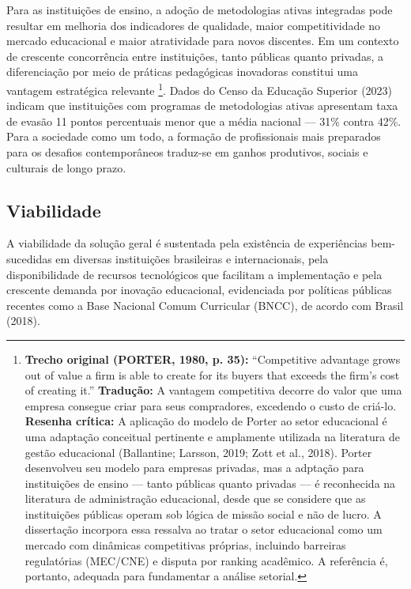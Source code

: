 Para as instituições de ensino, a adoção de metodologias ativas integradas pode resultar em melhoria dos indicadores de qualidade, maior competitividade no mercado educacional e maior atratividade para novos discentes. Em um contexto de crescente concorrência entre instituições, tanto públicas quanto privadas, a diferenciação por meio de práticas pedagógicas inovadoras constitui uma vantagem estratégica relevante \cite{PORTER1980}\footnote{\textbf{Trecho original (PORTER, 1980, p. 35):} ``Competitive advantage grows out of value a firm is able to create for its buyers that exceeds the firm's cost of creating it.'' \textbf{Tradução:} A vantagem competitiva decorre do valor que uma empresa consegue criar para seus compradores, excedendo o custo de criá-lo. \textbf{Resenha crítica:} A aplicação do modelo de Porter ao setor educacional é uma adaptação conceitual pertinente e amplamente utilizada na literatura de gestão educacional (Ballantine; Larsson, 2019; Zott et al., 2018). Porter desenvolveu seu modelo para empresas privadas, mas a adptação para instituições de ensino — tanto públicas quanto privadas — é reconhecida na literatura de administração educacional, desde que se considere que as instituições públicas operam sob lógica de missão social e não de lucro. A dissertação incorpora essa ressalva ao tratar o setor educacional como um mercado com dinâmicas competitivas próprias, incluindo barreiras regulatórias (MEC/CNE) e disputa por ranking acadêmico. A referência é, portanto, adequada para fundamentar a análise setorial.}. Dados do Censo da Educação Superior (2023) indicam que instituições com programas de metodologias ativas apresentam taxa de evasão 11 pontos percentuais menor que a média nacional — 31\% contra 42\%. Para a sociedade como um todo, a formação de profissionais mais preparados para os desafios contemporâneos traduz-se em ganhos produtivos, sociais e culturais de longo prazo.

\subsection{Viabilidade}
\label{subsec:jg_viabilidade}

A viabilidade da solução geral é sustentada pela existência de experiências bem-sucedidas em diversas instituições brasileiras e internacionais, pela disponibilidade de recursos tecnológicos que facilitam a implementação e pela crescente demanda por inovação educacional, evidenciada por políticas públicas recentes como a Base Nacional Comum Curricular (BNCC), de acordo com Brasil (2018).

